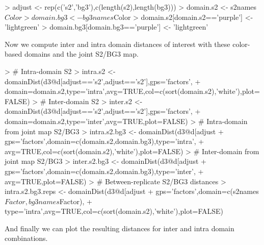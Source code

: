 \documentclass[a4paper,12pt,nogin]{article}
\begin{document}
\footnotesize
 
\begin{Schunk}
\begin{Sinput}
> adjust <- rep(c('s2','bg3'),c(length(s2),length(bg3)))
> domain.s2 <- s2names$Color
> domain.bg3 <- bg3names$Color
> domain.s2[domain.s2=='purple'] <- 'lightgreen'
> domain.bg3[domain.bg3=='purple'] <- 'lightgreen'
\end{Sinput}
\end{Schunk}

\normalsize
Now we compute inter and intra domain distances of interest with these color-based domains and the joint S2/BG3 map.

\footnotesize

\begin{Schunk}
\begin{Sinput}
> # Intra-domain S2
> intra.s2 <- domainDist(d3@d[adjust=='s2',adjust=='s2'],gps='factors',
+ domain=domain.s2,type='intra',avg=TRUE,col=c(sort(domain.s2),'white'),plot=FALSE)
> # Inter-domain S2
> inter.s2 <- domainDist(d3@d[adjust=='s2',adjust=='s2'],gps='factors',
+ domain=domain.s2,type='inter',avg=TRUE,plot=FALSE)
> # Intra-domain from joint map S2/BG3
> intra.s2.bg3 <- domainDist(d3@d[adjust %
+ gps='factors',domain=c(domain.s2,domain.bg3),type='intra',
+ avg=TRUE,col=c(sort(domain.s2),'white'),plot=FALSE)
> # Inter-domain from joint map S2/BG3
> inter.s2.bg3 <- domainDist(d3@d[adjust %
+ gps='factors',domain=c(domain.s2,domain.bg3),type='inter',
+ avg=TRUE,plot=FALSE)
> # Between-replicate S2/BG3 distances
> intra.s2.bg3.reps <- domainDist(d3@d[adjust %
+ gps='factors',domain=c(s2names$Factor,bg3names$Factor),
+ type='intra',avg=TRUE,col=c(sort(domain.s2),'white'),plot=FALSE)
\end{Sinput}
\end{Schunk}

\normalsize

And finally we can plot the resulting distances for inter and intra domain combinations.

\footnotesize

\begin{Schunk}
\end{Schunk}
 
\end{document}
